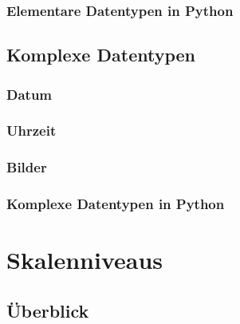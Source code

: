 \documentclass[
  oneside]{book}
\theoremstyle{definition}
\theoremstyle{definition}
\theoremstyle{definition}
\theoremstyle{definition}
\theoremstyle{remark}
\begin{document}
\hypertarget{elementare-datentypen-in-python-1}{%
\subsubsection{Elementare Datentypen in Python}\label{elementare-datentypen-in-python-1}}

\hypertarget{komplexe-datentypen-1}{%
\subsection{Komplexe Datentypen}\label{komplexe-datentypen-1}}

\hypertarget{datum-1}{%
\subsubsection{Datum}\label{datum-1}}

\hypertarget{uhrzeit-1}{%
\subsubsection{Uhrzeit}\label{uhrzeit-1}}

\hypertarget{bilder-1}{%
\subsubsection{Bilder}\label{bilder-1}}

\hypertarget{komplexe-datentypen-in-python-1}{%
\subsubsection{Komplexe Datentypen in Python}\label{komplexe-datentypen-in-python-1}}

\hypertarget{skalenniveaus-1}{%
\section{Skalenniveaus}\label{skalenniveaus-1}}

\hypertarget{uxfcberblick-1}{%
\subsection{Überblick}\label{uxfcberblick-1}}
\end{document}
